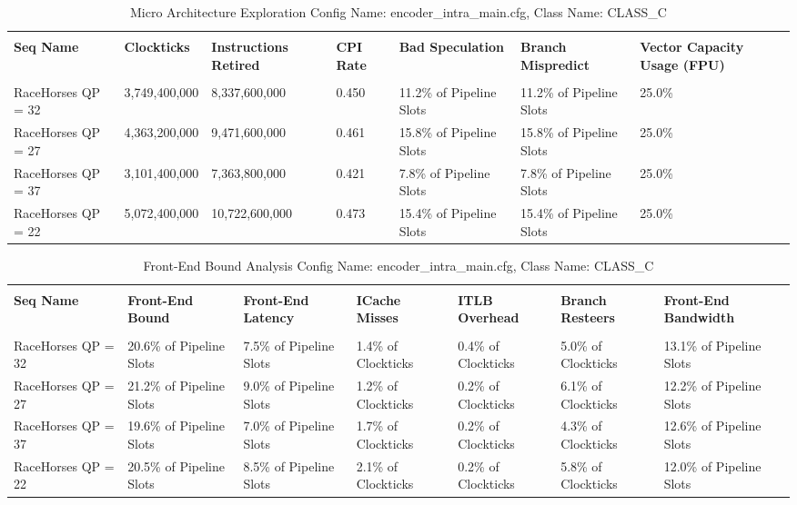 \documentclass{article}%
\begin{document}
\newpage%
\begin{longtabu}{| X[l] | X[l] | X[l] | X[l] | X[l] | X[l] | X[l] |}%
\caption{%
Micro Architecture Exploration\newline%
 Config Name: encoder\_intra\_main.cfg,\newline%
 Class Name: CLASS\_C\newline%
%
}%
\hline%
&&&&&&\\%
\textbf{Seq Name}&\textbf{Clockticks}&\textbf{Instructions Retired}&\textbf{CPI Rate}&\textbf{Bad Speculation}&\textbf{Branch Mispredict}&\textbf{Vector Capacity Usage (FPU)}\\%
&&&&&&\\%
\hline%
\endhead%
RaceHorses\newline%
 QP = 32&3,749,400,000&8,337,600,000&0.450&11.2\% of Pipeline Slots&11.2\% of Pipeline Slots&25.0\%\\%
\hline%
RaceHorses\newline%
 QP = 27&4,363,200,000&9,471,600,000&0.461&15.8\% of Pipeline Slots&15.8\% of Pipeline Slots&25.0\%\\%
\hline%
RaceHorses\newline%
 QP = 37&3,101,400,000&7,363,800,000&0.421&7.8\% of Pipeline Slots&7.8\% of Pipeline Slots&25.0\%\\%
\hline%
RaceHorses\newline%
 QP = 22&5,072,400,000&10,722,600,000&0.473&15.4\% of Pipeline Slots&15.4\% of Pipeline Slots&25.0\%\\%
\hline%
\end{longtabu}%
\begin{longtabu}{| X[l] | X[l] | X[l] | X[l] | X[l] | X[l] | X[l] |}%
\caption{%
Front{-}End Bound Analysis\newline%
 Config Name: encoder\_intra\_main.cfg,\newline%
 Class Name: CLASS\_C\newline%
%
}%
\hline%
&&&&&&\\%
\textbf{Seq Name}&\textbf{Front{-}End Bound}&\textbf{Front{-}End Latency}&\textbf{ICache Misses}&\textbf{ITLB Overhead}&\textbf{Branch Resteers}&\textbf{Front{-}End Bandwidth}\\%
&&&&&&\\%
\hline%
\endhead%
RaceHorses\newline%
 QP = 32&20.6\% of Pipeline Slots&7.5\% of Pipeline Slots&1.4\% of Clockticks&0.4\% of Clockticks&5.0\% of Clockticks&13.1\% of Pipeline Slots\\%
\hline%
RaceHorses\newline%
 QP = 27&21.2\% of Pipeline Slots&9.0\% of Pipeline Slots&1.2\% of Clockticks&0.2\% of Clockticks&6.1\% of Clockticks&12.2\% of Pipeline Slots\\%
\hline%
RaceHorses\newline%
 QP = 37&19.6\% of Pipeline Slots&7.0\% of Pipeline Slots&1.7\% of Clockticks&0.2\% of Clockticks&4.3\% of Clockticks&12.6\% of Pipeline Slots\\%
\hline%
RaceHorses\newline%
 QP = 22&20.5\% of Pipeline Slots&8.5\% of Pipeline Slots&2.1\% of Clockticks&0.2\% of Clockticks&5.8\% of Clockticks&12.0\% of Pipeline Slots\\%
\hline%
\end{longtabu}%
\end{document}

